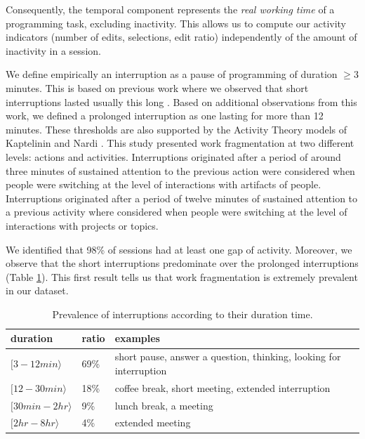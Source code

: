 \documentclass[times]{smrauth}
\begin{document}
Consequently, the temporal component represents the \textit{real working time} of a programming task, excluding inactivity. This allows us to compute our activity indicators (number of edits, selections, edit ratio) independently of the amount of inactivity in a session.

We define empirically an interruption as a pause of programming of duration $\geq 3$ minutes. 
This is based on previous work where we observed that short interruptions lasted usually this long \cite{GM04}. 
Based on additional observations from this work, we defined a prolonged interruption as one lasting for more than 12 minutes. 
These thresholds are also supported by the Activity Theory models of Kaptelinin and Nardi \cite{KaptelininN07}. This study presented work fragmentation at two different levels: actions and activities. Interruptions originated after a period of around three minutes of sustained attention to the previous action were considered when people were switching at the level of interactions with artifacts of people. Interruptions originated after a period of twelve minutes of sustained attention to a previous activity where considered when people were switching at the level of interactions with projects or topics.  

We identified that 98\% of sessions had at least one gap of activity. Moreover, we observe that the short interruptions predominate over the prolonged interruptions (Table \ref{tbl:by_duration}). This first result tells us that work fragmentation is extremely prevalent in our dataset.

\begin{table}[ht!]
\tiny
\renewcommand{\arraystretch}{1.3}
\caption{Prevalence of interruptions according to their duration time. }
\label{tbl:by_duration}
\centering
\begin{tabular}{p{3cm}|p{0.8cm}|p{4cm}} 
duration & ratio & examples  \\
  \hline   
$[3  - 12 min \rangle$ & 69\% & short pause, answer a question, thinking, looking for interruption  \\ 
\hline 
$[12  - 30 min \rangle$ & 18\% & coffee break, short meeting, extended interruption  \\
$[30 min - 2 hr \rangle$  & 9\% & lunch break, a meeting  \\
$[2 hr - 8 hr \rangle$ & 4\% & extended meeting \\
\end{tabular}
\end{table}
\end{document}

